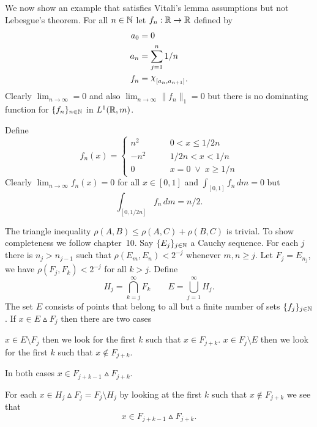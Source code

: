 \begin{enumerate}
\begin{itemize}
We now show an
example that satisfies Vitali's lemma assumptions but not
Lebesgue's theorem. For all \(n\in\mathbb{N}\)
let \(f_n: \mathbb{R}\to\mathbb{R}\) defined by 
\begin{align*}
a_0 &= 0 \\
a_n &= \sum_{j=1}^n 1/n \\
f_n &= \chhi_{[a_n,a_{n+1}]}.
\end{align*}
Clearly \(\lim_{n\to\infty}=0\) 
and also \(\lim_{n\to\infty} \|f_n\|_1 = 0\)
but there is no dominating function for \(\{f_n\}_{n\in\mathbb{N}}\)
in \(L^1(\mathbb{R},m)\).


Define
\begin{equation*}
f_n(x) = \left\{
\begin{array}{ll}
n^2        & \qquad 0 < x \leq 1/2n \\
-n^2       & \qquad 1/2n < x < 1/n \\
0          & \qquad x=0\;\vee\; x \geq 1/n
\end{array}\right.
\end{equation*}
Clearly \(\lim_{n\to\infty} f_n(x) = 0\) for all \(x\in[0,1]\)
and \(\int_{[0,1]} f_n\,dm = 0\) but
\begin{equation*}
\int_{[0,1/2n]} f_n\,dm = n/2.
\end{equation*}




The triangle inequality \(\rho(A,B)\leq \rho(A,C) + \rho(B,C)\)
is trivial. To show completeness we follow \cite{Oxtoby1980} chapter~10.
Say \(\{E_j\}_{j\in\mathbb{N}}\) a Cauchy sequence.
For each $j$ there is \(n_j > n_{j-1}\) such that \(\rho(E_m,E_n)<2^{-j}\)
whenever \(m,n\geq j\). Let \(F_j=E_{n_j}\), 
we have \(\rho(F_j,F_k)<2^{-j}\) for all \(k>j\). Define
\begin{equation*}
H_j = \bigcap_{k=j}^\infty F_k \qquad 
E = \bigcup_{j=1}^\infty H_j.
\end{equation*}
The set $E$ consists of points that belong to all 
but a finite number of sets \(\{f_j\}_{j\in\mathbb{N}}\).
If \(x\in E\vartriangle  F_j\) then there are two cases
\begin{itemize}
\(x\in  E\setminus F_j\) then we look for the first $k$
such that \(x\in F_{j+k}\).
\(x\in  F_j\setminus E\) then we look for the first $k$
such that \(x\notin F_{j+k}\).
\end{itemize}
In both cases \(x\in F_{j+k-1} \vartriangle F_{j+k}\).

For each  \(x\in H_j\vartriangle F_j = F_j \setminus H_j\)
by looking at the first $k$ such that \(x\notin F_{j+k}\)
we see that
\begin{equation*}
x \in F_{j+k-1} \vartriangle F_{j+k}.
\end{equation*}


\end{itemize}
\end{enumerate}
